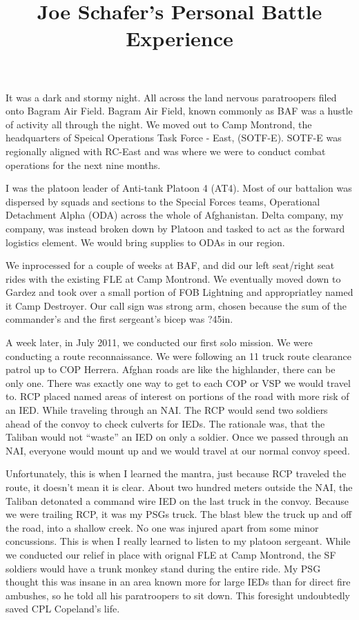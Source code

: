 \documentclass[]{article}
\title{Joe Schafer's Personal Battle Experience}
\begin{document}
\maketitle

It was a dark and stormy night. All across the land nervous paratroopers
filed onto Bagram Air Field. Bagram Air Field, known commonly as BAF was
a hustle of activity all through the night. We moved out to Camp
Montrond, the headquarters of Speical Operations Task Force - East,
(SOTF-E). SOTF-E was regionally aligned with RC-East and was where we
were to conduct combat operations for the next nine months.

I was the platoon leader of Anti-tank Platoon 4 (AT4). Most of our
battalion was dispersed by squads and sections to the Special Forces
teams, Operational Detachment Alpha (ODA) across the whole of
Afghanistan. Delta company, my company, was instead broken down by
Platoon and tasked to act as the forward logistics element. We would
bring supplies to ODAs in our region.

We inprocessed for a couple of weeks at BAF, and did our left seat/right
seat rides with the existing FLE at Camp Montrond. We eventually moved
down to Gardez and took over a small portion of FOB Lightning and
appropriatley named it Camp Destroyer. Our call sign was strong arm,
chosen because the sum of the commander's and the first sergeant's bicep
was ?45in.

A week later, in July 2011, we conducted our first solo mission. We were
conducting a route reconnaissance. We were following an 11 truck route
clearance patrol up to COP Herrera. Afghan roads are like the
highlander, there can be only one. There was exactly one way to get to
each COP or VSP we would travel to. RCP placed named areas of interest
on portions of the road with more risk of an IED. While traveling
through an NAI. The RCP would send two soldiers ahead of the convoy to
check culverts for IEDs. The rationale was, that the Taliban would not
``waste'' an IED on only a soldier. Once we passed through an NAI,
everyone would mount up and we would travel at our normal convoy speed.

Unfortunately, this is when I learned the mantra, just because RCP
traveled the route, it doesn't mean it is clear. About two hundred
meters outside the NAI, the Taliban detonated a command wire IED on the
last truck in the convoy. Because we were trailing RCP, it was my PSGs
truck. The blast blew the truck up and off the road, into a shallow
creek. No one was injured apart from some minor concussions. This is
when I really learned to listen to my platoon sergeant. While we
conducted our relief in place with orignal FLE at Camp Montrond, the SF
soldiers would have a trunk monkey stand during the entire ride. My PSG
thought this was insane in an area known more for large IEDs than for
direct fire ambushes, so he told all his paratroopers to sit down. This
foresight undoubtedly saved CPL Copeland's life.
\end{document}
